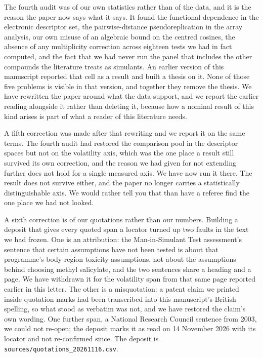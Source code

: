 \documentclass[11pt,a4paper]{article}
\begin{document}
The fourth audit was of our own statistics rather than of the data, and it is the
reason the paper now says what it says. It found the functional dependence in the
electronic descriptor set, the pairwise-distance pseudoreplication in the array
analysis, our own misuse of an algebraic bound on the centred cosines, the
absence of any multiplicity
correction across eighteen tests we had in fact computed, and the fact that we had
never run the panel that includes the other compounds the literature treats as
simulants. An earlier version
of this manuscript reported that cell as a result and built a thesis on it. None
of those five problems is visible in that version, and together they remove the
thesis. We have rewritten the paper around what the data support, and we report
the earlier reading alongside it rather than deleting it, because how a nominal
result of this kind arises is part of what a reader of this literature needs.

A fifth correction was made after that rewriting and we report it on the same
terms. The fourth audit had restored the comparison pool in the descriptor
spaces but not on the volatility axis, which was the one place a result still
survived its own correction, and the reason we had given for not extending
further does not hold for a single measured axis. We have now run it there. The
result does not survive either, and the paper no longer carries a statistically
distinguishable axis. We would rather tell you that than have a referee find
the one place we had not looked.

A sixth correction is of our quotations rather than our numbers. Building a
deposit that gives every quoted span a locator turned up two faults in the text
we had frozen. One is an attribution: the Man-in-Simulant Test assessment's
sentence that certain assumptions have not been tested is about that
programme's body-region toxicity assumptions, not about the assumptions behind
choosing methyl salicylate, and the two sentences share a heading and a page.
We have withdrawn it for the volatility span from that same page reported
earlier in this letter. The other is a misquotation: a patent claim we printed
inside quotation marks had been transcribed into this manuscript's British
spelling, so what stood as verbatim was not, and we have restored the claim's
own wording. One further span, a National Research Council sentence from
2003, we could not re-open; the deposit marks it as read on 14 November 2026 with its
locator and not re-confirmed since. The deposit is
\texttt{sources/\allowbreak quotations\_20261116.csv}.
\end{document}
